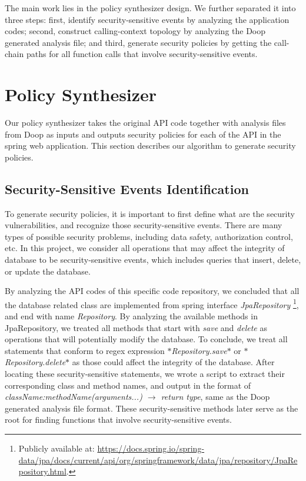 The main work lies in the policy synthesizer design. We further separated it
into three steps: first, identify security-sensitive events by analyzing the
application codes; second, construct calling-context topology by analyzing the
Doop generated analysis file; and third, generate security policies by getting
the call-chain paths for all function calls that involve security-sensitive
events.

\section{Policy Synthesizer}
\label{sec:policy}

Our policy synthesizer takes the original API code together with analysis files
from Doop as inputs and outputs security policies for each of the API in the
spring web application.
%
This section describes our algorithm to generate security policies.
%

\subsection{Security-Sensitive Events Identification}
To generate security policies, it is important to first define what are the
security vulnerabilities, and recognize those security-sensitive events. There
are many types of possible security problems, including data safety,
authorization control, etc. In this project, we consider all operations that may
affect the integrity of database to be security-sensitive events, which includes
queries that insert, delete, or update the database.

By analyzing the API codes of this specific code repository, we concluded that
all the database related class are implemented from spring interface
\textit{JpaRepository} \footnote{Publicly available at:
  \url{https://docs.spring.io/spring-data/jpa/docs/current/api/org/springframework/data/jpa/repository/JpaRepository.html}.},
and end with name \textit{Repository}. By analyzing the available methods in
JpaRepository, we treated all methods that start with \textit{save} and
\textit{delete} as operations that will potentially modify the database. To
conclude, we treat all statements that conform to regex expression
\textit{$*$Repository.save$*$} or \textit{$*$Repository.delete$*$} as those
could affect the integrity of the database. After locating these
security-sensitive statements, we wrote a script to extract their corresponding
class and method names, and output in the format of
\textit{className:methodName(arguments...) $\rightarrow$ return type}, same as
the Doop generated analysis file format. These security-sensitive methods later
serve as the root for finding functions that involve security-sensitive events.


